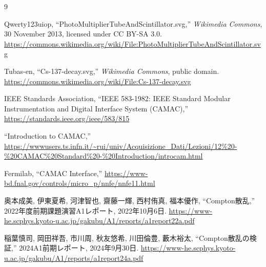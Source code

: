 \documentclass[uplatex,dvipdfmx,12pt,nomag]{jsarticle}
\begin{document}
\begin{thebibliography}{9}

Qwerty123uiop,
``PhotoMultiplierTubeAndScintillator.svg,''
\textit{Wikimedia Commons},
30 November 2013,
licensed under CC BY-SA 3.0.
\url{https://commons.wikimedia.org/wiki/File:PhotoMultiplierTubeAndScintillator.svg}

Tubas-en,
``Cs-137-decay.svg,''
\textit{Wikimedia Commons},
public domain.
\url{https://commons.wikimedia.org/wiki/File:Cs-137-decay.svg}

IEEE Standards Association,
``IEEE 583-1982: IEEE Standard Modular Instrumentation and Digital Interface System (CAMAC),''
\url{https://standards.ieee.org/ieee/583/815}

``Introduction to CAMAC,''
\url{https://wwwusers.ts.infn.it/~rui/univ/Acquisizione_Dati/Lezioni/12%20-%20CAMAC%20Standard%20-%20Introduction/introcam.html}

Fermilab,
``CAMAC Interface,''
\url{https://www-bd.fnal.gov/controls/micro_p/nnfe/nnfe11.html}

奥本成美, 伊東夏希, 河津智也, 齋藤一輝, 西村侑真, 福本優作,
``Compton散乱,''
2022年度前期課題演習A1レポート,
2022年10月6日.
\url{https://www-he.scphys.kyoto-u.ac.jp/gakubu/A1/reports/a1report22a.pdf}

稲葉慎司, 岡田祥吾, 市川周, 秋友悠希, 川田倫豊, 藪木裕太,
``Compton散乱の検証,''
2024A1前期レポート,
2024年9月30日.
\url{https://www-he.scphys.kyoto-u.ac.jp/gakubu/A1/reports/a1report24a.pdf}

\end{thebibliography}
\end{document}

